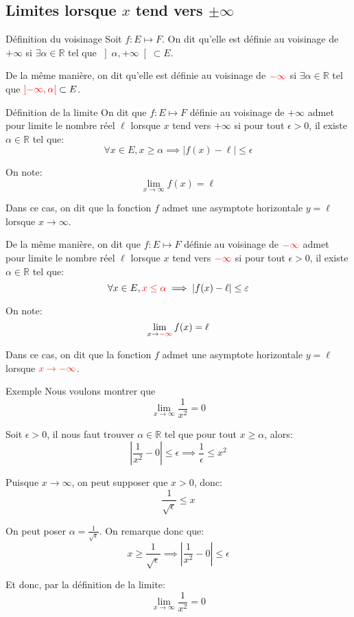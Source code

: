 \documentclass[a4paper]{article}
\begin{document}
\subsection{Limites lorsque $x$ tend vers $\pm \infty$}
\begin{parag}{Définition du voisinage}
    Soit $f: E \mapsto F$. On dit qu'elle est définie au voisinage de $+\infty$ si $\exists \alpha \in \mathbb{R}$ tel que $\left]\alpha, +\infty\right[ \subset E$.

    De la même manière, on dit qu'elle est définie au voisinage de ${\color{red}-\infty}$ si $\exists \alpha \in \mathbb{R}$ tel que ${\color{red}\left]-\infty, \alpha\right[} \subset E$.
\end{parag}

\begin{parag}{Définition de la limite}
    On dit que $f : E\mapsto F$ définie au voisinage de $+\infty$ admet pour limite le nombre réel $\ell$ lorsque $x$ tend vers $+\infty$ si pour tout $\epsilon > 0$, il existe $\alpha \in \mathbb{R}$ tel que:
    \[\forall x \in E, x \geq \alpha \implies \left|f\left(x\right) - \ell\right| \leq \epsilon\]

    On note:
    \[\lim_{x \to \infty} f\left(x\right) = \ell\]

    Dans ce cas, on dit que la fonction $f$ admet une asymptote horizontale $y = \ell$ lorsque $x \to \infty$.

    De la même manière, on dit que $f : E\mapsto F$ définie au voisinage de ${\color{red}-\infty}$ admet pour limite le nombre réel $\ell$ lorsque $x$ tend vers ${\color{red}-\infty}$ si pour tout $\epsilon > 0$, il existe $\alpha \in \mathbb{R}$ tel que:
    \[\forall x \in E, {\color{red}x \leq \alpha} \implies \left|f\left(x\right) - \ell\right| \leq \epsilon\]

    On note:
    \[\lim_{x \to {\color{red}-\infty}} f\left(x\right) = \ell\]

    Dans ce cas, on dit que la fonction $f$ admet une asymptote horizontale $y = \ell$ lorsque ${\color{red}x \to -\infty}$.
\end{parag}

\begin{parag}{Exemple}
    Nous voulons montrer que
    \[\lim_{x \to \infty} \frac{1}{x^2} = 0\]

    Soit $\epsilon > 0$, il nous faut trouver $\alpha \in \mathbb{R}$ tel que pour tout $x \geq \alpha$, alors:
    \[\left|\frac{1}{x^2} - 0\right| \leq \epsilon \implies \frac{1}{\epsilon} \leq x^2\]

    Puisque $x \to \infty$, on peut supposer que $x > 0$, donc:
    \[\frac{1}{\sqrt{\epsilon}} \leq x\]

    On peut poser $\alpha = \frac{1}{\sqrt{\epsilon}}$. On remarque donc que:
    \[x \geq \frac{1}{\sqrt{\epsilon}} \implies \left|\frac{1}{x^2} - 0\right| \leq \epsilon\]

    Et donc, par la définition de la limite:
    \[\lim_{x \to \infty} \frac{1}{x^2} = 0\]
\end{parag}
\end{document}
